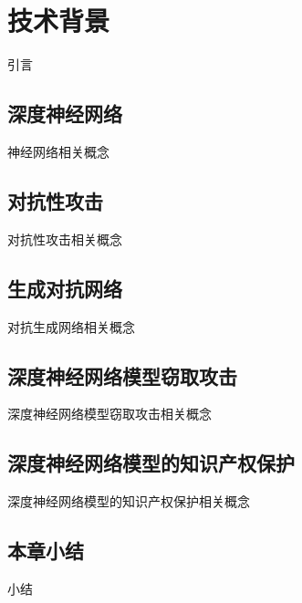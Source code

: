 

\chapter{技术背景} 
\label{2}

引言

\section{深度神经网络}

神经网络相关概念

\section{对抗性攻击}


对抗性攻击相关概念


\section{生成对抗网络}
\label{sec:ex:A}

对抗生成网络相关概念


\section{深度神经网络模型窃取攻击}

深度神经网络模型窃取攻击相关概念


\section{深度神经网络模型的知识产权保护}


深度神经网络模型的知识产权保护相关概念


\section{本章小结}
\label{sec:relatedwork:table}

小结
